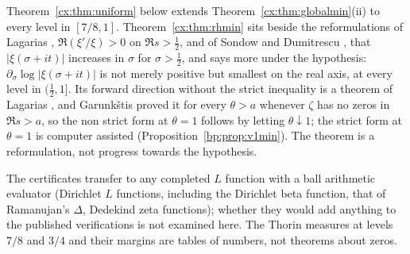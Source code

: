 Theorem~\ref{cx:thm:uniform} below extends Theorem~\ref{cx:thm:globalmin}(ii) to every level in $[7/8,1]$. Theorem~\ref{cx:thm:rhmin} sits beside the reformulations of Lagarias \cite{Lagarias}, $\Re(\xi'/\xi)>0$ on $\Re s>\tfrac12$, and of Sondow and Dumitrescu \cite{SD10}, that $|\xi(\sigma+it)|$ increases in $\sigma$ for $\sigma>\tfrac12$, and says more under the hypothesis: $\partial_\sigma\log|\xi(\sigma+it)|$ is not merely positive but smallest on the real axis, at every level in $(\tfrac12,1]$. Its forward direction without the strict inequality is a theorem of Lagarias \cite{Lagarias}, and Garunk\v{s}tis \cite{Garunkstis02} proved it for every $\theta>a$ whenever $\zeta$ has no zeros in $\Re s>a$, so the non strict form at $\theta=1$ follows by letting $\theta\downarrow1$; the strict form at $\theta=1$ is computer assisted (Proposition~\ref{bp:prop:v1min}). The theorem is a reformulation, not progress towards the hypothesis.

The certificates transfer to any completed $L$ function with a ball arithmetic evaluator (Dirichlet $L$ functions, including the Dirichlet beta function, that of Ramanujan's $\Delta$, Dedekind zeta functions); whether they would add anything to the published verifications is not examined here. The Thorin measures at levels $7/8$ and $3/4$ and their margins are tables of numbers, not theorems about zeros.
